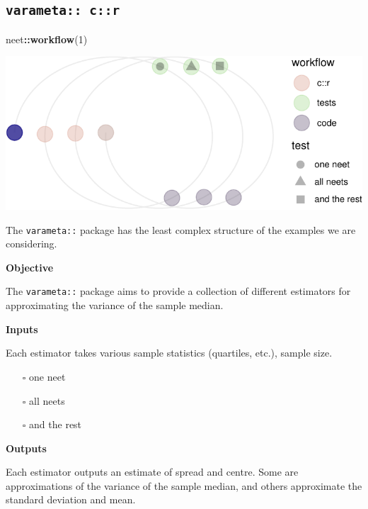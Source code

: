 \documentclass[
]{article}
\newenvironment{Shaded}{\begin{snugshade}}{\end{snugshade}}
\newcommand{\DecValTok}[1]{\textcolor[rgb]{0.00,0.00,0.81}{#1}}
\newcommand{\KeywordTok}[1]{\textcolor[rgb]{0.13,0.29,0.53}{\textbf{#1}}}
\newcommand{\NormalTok}[1]{#1}
\newcommand{\OperatorTok}[1]{\textcolor[rgb]{0.81,0.36,0.00}{\textbf{#1}}}
\providecommand{\tightlist}{%
  \setlength{\itemsep}{0pt}\setlength{\parskip}{0pt}}
\begin{document}
\hypertarget{varameta-cr}{%
\subsection{\texorpdfstring{\texttt{varameta::\ c::r}}{varameta:: c::r}}\label{varameta-cr}}

\begin{Shaded}
\begin{Highlighting}[]
\NormalTok{neet}\OperatorTok{::}\KeywordTok{workflow}\NormalTok{(}\DecValTok{1}\NormalTok{)}
\end{Highlighting}
\end{Shaded}

\begin{center}\includegraphics{when-is-done-done_files/figure-latex/unnamed-chunk-4-1} \end{center}

The \texttt{varameta::} package has the least complex structure of the
examples we are considering.

\textbf{Objective}

The \texttt{varameta::} package aims to provide a collection of
different estimators for approximating the variance of the sample
median.

\textbf{Inputs}

Each estimator takes various sample statistics (quartiles, etc.), sample
size.

\begin{itemize}
\tightlist
\item[$\square$]
  one neet
\item[$\square$]
  all neets
\item[$\square$]
  and the rest
\end{itemize}

\textbf{Outputs}

Each estimator outputs an estimate of spread and centre. Some are
approximations of the variance of the sample median, and others
approximate the standard deviation and mean.
\end{document}
